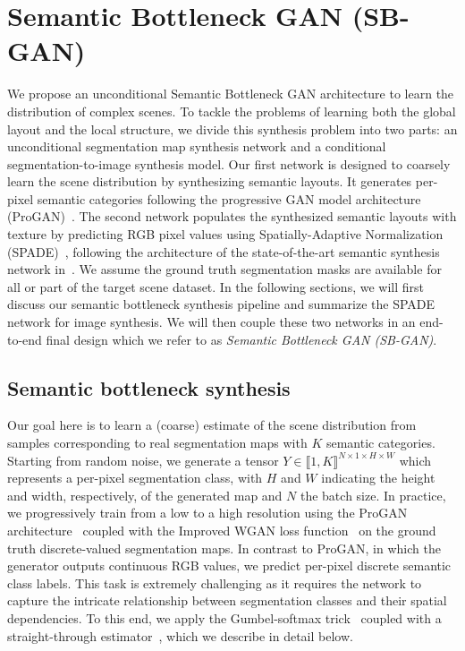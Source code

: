 \documentclass[10pt,twocolumn,letterpaper]{article}
\begin{document}
\section{Semantic Bottleneck GAN (SB-GAN)}
We propose an unconditional Semantic Bottleneck GAN architecture to learn the distribution of complex scenes. To tackle the problems of learning both the global layout and the local structure, we divide this synthesis problem into two parts: an unconditional segmentation map synthesis network and a conditional segmentation-to-image synthesis model. Our first network is designed to coarsely learn the scene distribution by synthesizing semantic layouts. It generates per-pixel semantic categories following the progressive GAN model architecture (ProGAN)~\cite{PGGAN}.
The second network populates the synthesized semantic layouts with texture by predicting RGB pixel values using Spatially-Adaptive Normalization (SPADE)~\cite{SPADE}, following the architecture of the state-of-the-art semantic synthesis network in~\cite{SPADE}. We assume the ground truth segmentation masks are available for all or part of the target scene dataset. In the following sections, we will first discuss our semantic bottleneck synthesis pipeline and summarize the SPADE network for image synthesis. We will then couple these two networks in an end-to-end final design which we refer to as \textit{Semantic Bottleneck GAN (SB-GAN)}.

\subsection{Semantic bottleneck synthesis}\label{SB-network}
Our goal here is to learn a (coarse) estimate of the scene distribution from samples corresponding to real segmentation maps with $K$ semantic categories. Starting from random noise, we generate a tensor $Y \in \llbracket 1,K\rrbracket^{N \times 1 \times H \times W}$ which represents a per-pixel segmentation class, with $H$ and $W$ indicating the height and width, respectively, of the generated map and $N$ the batch size. In practice, we progressively train from a low to a high resolution using the ProGAN architecture~\cite{PGGAN} coupled with the Improved WGAN loss function~\cite{improvedWGAN} on the ground truth discrete-valued segmentation maps. In contrast to ProGAN, in which the generator outputs continuous RGB values, we predict per-pixel discrete semantic class labels. This task is extremely challenging as it requires the network to capture the intricate relationship between segmentation classes and their spatial dependencies.
To this end, we apply the Gumbel-softmax trick~\cite{jang2016categorical, maddison2016concrete} coupled with a straight-through estimator~\cite{jang2016categorical}, which we describe in detail below.
\end{document}
